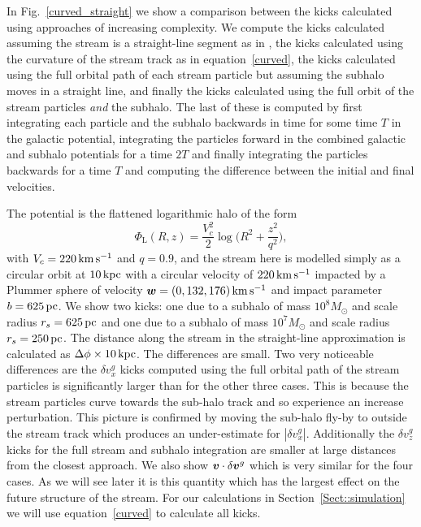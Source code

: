 \documentclass[useAMS,usenatbib,fleqn,a4paper]{mn2e}
\def\kpc{\,{\rm kpc}}
\def\pc{\,{\rm pc}}
\def\kms{\,{\rm km\,s^{-1}}}
\newcommand{\bs}[1]{\bmath{#1}}
\begin{document}
In Fig.~\ref{curved_straight} we show a comparison between the kicks calculated using approaches of increasing complexity. We compute the kicks calculated assuming the stream is a straight-line segment as in \cite{ErkalBelokurov2015}, the kicks calculated using the curvature of the stream track as in equation~\eqref{curved}, the kicks calculated using the full orbital path of each stream particle but assuming the subhalo moves in a straight line, and finally the kicks calculated using the full orbit of the stream particles \emph{and} the subhalo. The last of these is computed by first integrating each particle and the subhalo backwards in time for some time $T$ in the galactic potential, integrating the particles forward in the combined galactic and subhalo potentials for a time $2T$ and finally integrating the particles backwards for a time $T$ and computing the difference between the initial and final velocities.

The potential is the flattened logarithmic halo of the form
\begin{equation}
\Phi_\mathrm{L}(R,z) = \frac{V_c^2}{2}\log\Big(R^2+\frac{z^2}{q^2}\Big),
\label{potential}
\end{equation}
with $V_c = 220\kms$ and $q = 0.9$, and the stream here is modelled simply as a circular orbit at $10\kpc$ with a circular velocity of $220\kms$ impacted by a Plummer sphere of velocity $\bs{w}=(0,132,176)\kms$ and impact parameter $b=625\pc$. We show two kicks: one due to a subhalo of mass $10^8M_\odot$ and scale radius $r_s=625\pc$ and one due to a subhalo of mass $10^7M_\odot$ and scale radius $r_s=250\pc$. The distance along the stream in the straight-line approximation is calculated as $\Delta\phi\times10\kpc$. The differences are small. Two very noticeable differences are the $\delta v^g_x$ kicks computed using the full orbital path of the stream particles is significantly larger than for the other three cases. This is because the stream particles curve towards the sub-halo track and so experience an increase perturbation. This picture is confirmed by moving the sub-halo fly-by to outside the stream track which produces an under-estimate for $|\delta v^g_x|$. Additionally the $\delta v^g_z$ kicks for the full stream and subhalo integration are smaller at large distances from the closest approach. We also show $\bs{v}\cdot\delta\bs{v}^g$ which is very similar for the four cases. As we will see later it is this quantity which has the largest effect on the future structure of the stream. For our calculations in Section~\ref{Sect::simulation} we will use equation~\eqref{curved} to calculate all kicks.
\end{document}
